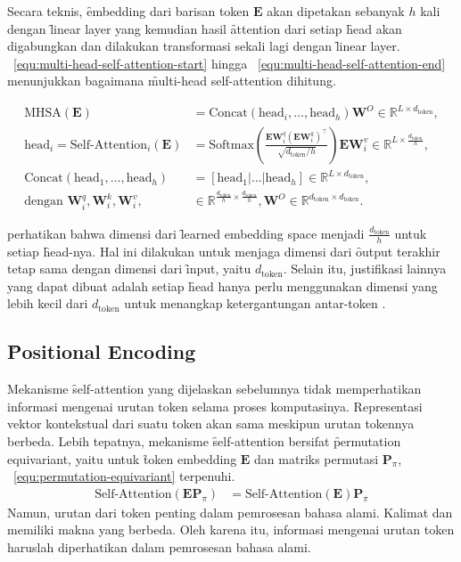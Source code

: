 	Secara teknis, \f{embedding} dari barisan token $\mathbf{E}$ akan dipetakan sebanyak $h$ kali dengan \f{linear layer} yang kemudian hasil \f{attention} dari setiap \f{head} akan digabungkan dan dilakukan transformasi sekali lagi dengan \f{linear layer}. \equ~\ref{equ:multi-head-self-attention-start} hingga \equ~\ref{equ:multi-head-self-attention-end} menunjukkan bagaimana \f{multi-head self-attention} dihitung.

	\begin{align}
		\label{equ:multi-head-self-attention-start}
		\text{MHSA}(\mathbf{E}) &= \text{Concat}(\text{head}_i, \dots, \text{head}_h)\mathbf{W}^O \in \mathbb{R}^{L \times d_{\text{token}}}, \\
		\text{head}_i = \text{Self-Attention}_i(\mathbf{E}) &= \text{Softmax}(\frac{\mathbf{E} \mathbf{W}^q_i (\mathbf{E} \mathbf{W}^k_i)^{\top}}{\sqrt{d_{\text{token}}/h}}) \mathbf{E} \mathbf{W}^v_i  \in  \mathbb{R}^{L \times \frac{d_{\text{token}}}{h}}, \\
		\text{Concat}(\text{head}_1, \dots, \text{head}_h) &= [\text{head}_1 | \dots | \text{head}_h] \in \mathbb{R}^{L \times d_{\text{token}}}, \\
		\label{equ:multi-head-self-attention-end}
		\text{dengan } \mathbf{W}^q_i, \mathbf{W}^k_i, \mathbf{W}^v_i,&\in \mathbb{R}^{\frac{d_{\text{token}}}{h} \times \frac{d_{\text{token}}}{h}}, \mathbf{W}^O \in \mathbb{R}^{d_{\text{token}} \times d_{\text{token}}}.
	\end{align}

	perhatikan bahwa dimensi dari \f{learned embedding space} menjadi $\frac{d_{\text{token}}}{h}$ untuk setiap \f{head}-nya. Hal ini dilakukan untuk menjaga dimensi dari \f{output} terakhir tetap sama dengan dimensi dari \f{input}, yaitu $d_{\text{token}}$. Selain itu, justifikasi lainnya yang dapat dibuat adalah setiap \f{head} hanya perlu menggunakan dimensi yang lebih kecil dari $d_{\text{token}}$ untuk menangkap ketergantungan antar-token \citep{pi-tau2023transformer}.

	\subsection{\f{Positional Encoding}}
	\label{sec:positional-encoding}
	Mekanisme \f{self-attention} yang dijelaskan sebelumnya tidak memperhatikan informasi mengenai urutan token selama proses komputasinya. Representasi vektor kontekstual dari suatu token akan sama meskipun urutan tokennya berbeda. Lebih tepatnya, mekanisme \f{self-attention} bersifat \f{permutation equivariant}, yaitu untuk \f{token embedding} $\mathbf{E}$ dan matriks permutasi $\mathbf{P}_{\pi}$, \equ~\ref{equ:permutation-equivariant} terpenuhi.
	\begin{align}
	\label{equ:permutation-equivariant}
	\text{Self-Attention}(\mathbf{EP}_{\pi}) &= \text{Self-Attention}(\mathbf{E})\mathbf{P}_{\pi}
	\end{align}
	Namun, urutan dari token penting dalam pemrosesan bahasa alami. Kalimat  dan  memiliki makna yang berbeda. Oleh karena itu, informasi mengenai urutan token haruslah diperhatikan dalam pemrosesan bahasa alami.
	
